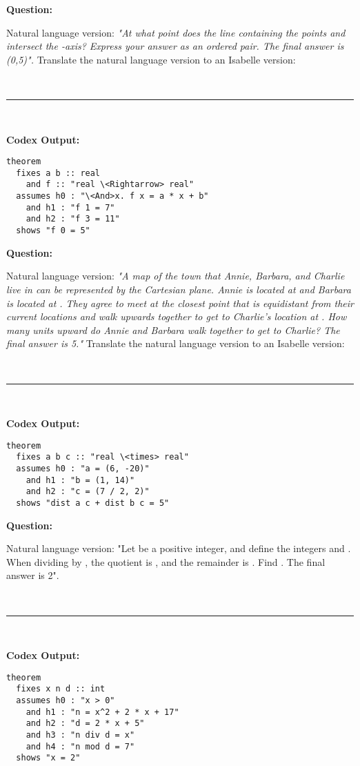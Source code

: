 \documentclass{article}
\begin{document}
\begin{boxB}
\textbf{Question:}

Natural language version: \emph{"At what point does the line containing the points 
 and  intersect the -axis? Express your answer as an ordered pair. 
The final answer is (0,5)".} Translate the natural language version to an Isabelle version:

\
\hrule
\

\textbf{Codex Output:}
\begin{lstlisting}
theorem
  fixes a b :: real
    and f :: "real \<Rightarrow> real"
  assumes h0 : "\<And>x. f x = a * x + b"
    and h1 : "f 1 = 7"
    and h2 : "f 3 = 11"
  shows "f 0 = 5"
\end{lstlisting}
\end{boxB}



\begin{boxB}
\textbf{Question:}

Natural language version: \emph{"A map of the town that Annie, Barbara, 
and Charlie live in can be represented by the Cartesian plane.
 Annie is located at  and Barbara is located at .
 They agree to meet at the closest point that is equidistant from their current 
locations and walk upwards together to get to Charlie's location at . How many units upward do Annie and Barbara walk together to get to Charlie? 
The final answer is 5."} Translate the natural language version to an Isabelle version:

\
\hrule
\

\textbf{Codex Output:}
\begin{lstlisting}
theorem
  fixes a b c :: "real \<times> real"
  assumes h0 : "a = (6, -20)"
    and h1 : "b = (1, 14)"
    and h2 : "c = (7 / 2, 2)"
  shows "dist a c + dist b c = 5"
\end{lstlisting}
\end{boxB}



\begin{boxB}
\textbf{Question:}

Natural language version: "Let  be a positive integer, 
and define the integers  and . When dividing  by , 
the quotient is , and the remainder is . Find . The final answer is 2".

\
\hrule
\

\textbf{Codex Output:}
\begin{lstlisting}
theorem
  fixes x n d :: int
  assumes h0 : "x > 0"
    and h1 : "n = x^2 + 2 * x + 17"
    and h2 : "d = 2 * x + 5"
    and h3 : "n div d = x"
    and h4 : "n mod d = 7"
  shows "x = 2"
\end{lstlisting}
\end{boxB}
\end{document}

